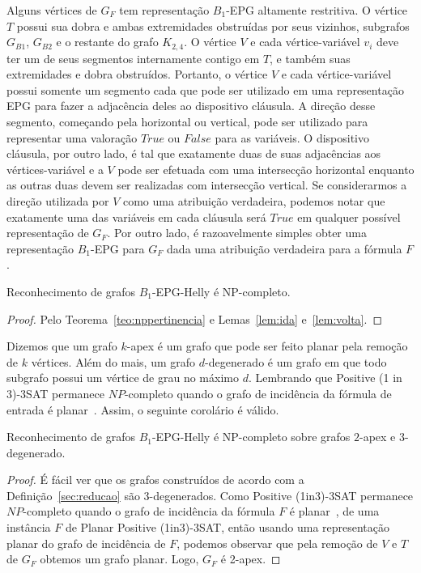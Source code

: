 \smallskip

Alguns vértices de  $G_F$ tem representação $B_1$-EPG altamente restritiva. O vértice $T$ possui sua dobra e ambas extremidades obstruídas por seus vizinhos, subgrafos $G_{B1}$, $G_{B2}$ e o restante do grafo $K_{2,4}$. O vértice $V$ e cada  vértice-variável $v_i$ deve ter um de seus segmentos internamente contigo em  $T$, e também suas extremidades e dobra obstruídos.  Portanto, o vértice $V$ e cada 
vértice-variável possui somente um segmento cada que pode ser utilizado em uma representação EPG para fazer a adjacência deles ao dispositivo cláusula. A direção desse segmento, começando pela horizontal ou vertical, pode ser utilizado para representar uma valoração $True$ ou $False$ para as variáveis. O  dispositivo cláusula, por outro lado, é tal que exatamente duas de suas adjacências aos vértices-variável e a $V$ pode ser efetuada com uma intersecção horizontal enquanto as outras duas  devem ser realizadas com intersecção vertical. Se considerarmos a direção utilizada por  $V$ como uma atribuição verdadeira, podemos notar que exatamente uma das variáveis em cada cláusula será $True$ em qualquer possível representação de  $G_F$. Por outro lado, é razoavelmente simples obter uma representação $B_1$-EPG para $G_F$ dada uma atribuição verdadeira para a fórmula $F$.


\begin{theorem}
{\sc Reconhecimento de grafos $B_{1}$-EPG-Helly } é NP-completo.
\end{theorem}
\begin{proof}
Pelo Teorema~\ref{teo:nppertinencia} e Lemas~\ref{lem:ida} e~\ref{lem:volta}.
 \end{proof} %

Dizemos que um grafo $k$-apex é um grafo que pode ser feito planar pela remoção de $k$ vértices. Além do mais, um grafo $d$-degenerado é um grafo em que todo subgrafo possui um vértice de grau no máximo $d$. Lembrando que  {\sc Positive (1 in 3)-3SAT} permanece $NP$-completo quando o grafo de incidência da fórmula de entrada é planar~\cite{mulzer2008minimum}. Assim, o seguinte corolário é válido.

\begin{corollary}
 \label{coro:2apexAnd3degenerate}
{\sc Reconhecimento de grafos $B_{1}$-EPG-Helly} é NP-completo sobre grafos $2$-apex e $3$-degenerado.
\end{corollary}

\begin{proof}
É fácil ver que os grafos construídos de acordo com a Definição~\ref{sec:reducao} são $3$-degenerados.
Como {\sc Positive (1in3)-3SAT} permanece $NP$-completo quando o grafo de incidência da fórmula  $F$ é planar~\cite{mulzer2008minimum},  de uma instância $F$ de {\sc Planar Positive (1in3)-3SAT}, então usando uma representação planar do grafo de incidência de $F$, podemos observar que pela remoção de $V$ e $T$ de $G_F$ obtemos um grafo planar. Logo, $G_F$ é 2-apex. 
\end{proof}

